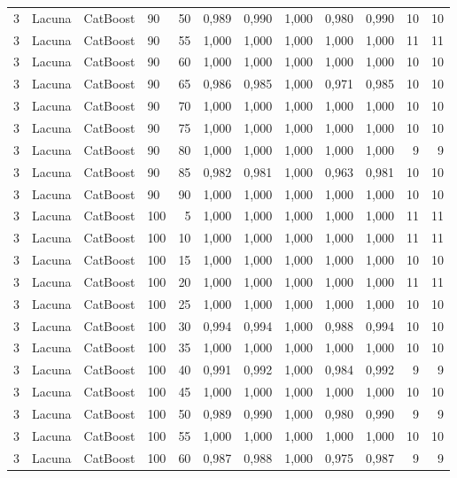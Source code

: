 \begin{longtable}{ccclrrrrrrrr}
3 & Lacuna & CatBoost & 90 & 50 & 0,989 & 0,990 & 1,000 & 0,980 & 0,990 & 10 & 10 \\
3 & Lacuna & CatBoost & 90 & 55 & 1,000 & 1,000 & 1,000 & 1,000 & 1,000 & 11 & 11 \\
3 & Lacuna & CatBoost & 90 & 60 & 1,000 & 1,000 & 1,000 & 1,000 & 1,000 & 10 & 10 \\
3 & Lacuna & CatBoost & 90 & 65 & 0,986 & 0,985 & 1,000 & 0,971 & 0,985 & 10 & 10 \\
3 & Lacuna & CatBoost & 90 & 70 & 1,000 & 1,000 & 1,000 & 1,000 & 1,000 & 10 & 10 \\
3 & Lacuna & CatBoost & 90 & 75 & 1,000 & 1,000 & 1,000 & 1,000 & 1,000 & 10 & 10 \\
3 & Lacuna & CatBoost & 90 & 80 & 1,000 & 1,000 & 1,000 & 1,000 & 1,000 & 9 & 9 \\
3 & Lacuna & CatBoost & 90 & 85 & 0,982 & 0,981 & 1,000 & 0,963 & 0,981 & 10 & 10 \\
3 & Lacuna & CatBoost & 90 & 90 & 1,000 & 1,000 & 1,000 & 1,000 & 1,000 & 10 & 10 \\
3 & Lacuna & CatBoost & 100 & 5 & 1,000 & 1,000 & 1,000 & 1,000 & 1,000 & 11 & 11 \\
3 & Lacuna & CatBoost & 100 & 10 & 1,000 & 1,000 & 1,000 & 1,000 & 1,000 & 11 & 11 \\
3 & Lacuna & CatBoost & 100 & 15 & 1,000 & 1,000 & 1,000 & 1,000 & 1,000 & 10 & 10 \\
3 & Lacuna & CatBoost & 100 & 20 & 1,000 & 1,000 & 1,000 & 1,000 & 1,000 & 11 & 11 \\
3 & Lacuna & CatBoost & 100 & 25 & 1,000 & 1,000 & 1,000 & 1,000 & 1,000 & 10 & 10 \\
3 & Lacuna & CatBoost & 100 & 30 & 0,994 & 0,994 & 1,000 & 0,988 & 0,994 & 10 & 10 \\
3 & Lacuna & CatBoost & 100 & 35 & 1,000 & 1,000 & 1,000 & 1,000 & 1,000 & 10 & 10 \\
3 & Lacuna & CatBoost & 100 & 40 & 0,991 & 0,992 & 1,000 & 0,984 & 0,992 & 9 & 9 \\
3 & Lacuna & CatBoost & 100 & 45 & 1,000 & 1,000 & 1,000 & 1,000 & 1,000 & 10 & 10 \\
3 & Lacuna & CatBoost & 100 & 50 & 0,989 & 0,990 & 1,000 & 0,980 & 0,990 & 9 & 9 \\
3 & Lacuna & CatBoost & 100 & 55 & 1,000 & 1,000 & 1,000 & 1,000 & 1,000 & 10 & 10 \\
3 & Lacuna & CatBoost & 100 & 60 & 0,987 & 0,988 & 1,000 & 0,975 & 0,987 & 9 & 9 \\

\end{longtable}

